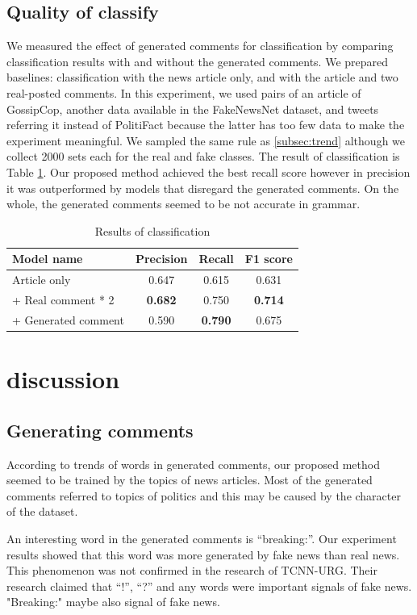 \documentclass[conference]{IEEEtran}
\begin{document}
\subsection{Quality of classify}
We measured the effect of generated comments for classification by comparing classification results with and without the generated comments.
We prepared baselines: classification with the news article only, and with the article and two real-posted comments.
In this experiment, we used pairs of an article of
GossipCop, another data available in the FakeNewsNet dataset, and tweets referring it instead of PolitiFact because the latter has too few data to make the experiment meaningful.
We sampled the same rule as \ref{subsec:trend} although we collect 2000 sets each for the real and fake classes.
The result of classification is Table \ref{tbl:classify_results}.
Our proposed method achieved the best recall score however in precision it was outperformed by models that disregard the generated comments.
On the whole, the generated comments seemed to be not accurate in grammar.

\begin{table}[!t]
    \renewcommand{\arraystretch}{1.3}
    \caption{Results of classification}
    \label{tbl:classify_results}
    \centering
    \begin{tabular}{lccc}
    \hline
    Model name           & Precision & Recall & F1 score \\ \hline
    Article only         & 0.647     & 0.615  & 0.631    \\
     + Real comment * 2  & \textbf{0.682}     & 0.750  & \textbf{0.714}    \\
     + Generated comment & 0.590     & \textbf{0.790}  & 0.675    \\ \hline
    \end{tabular}
    \end{table}
\section{discussion}
\subsection{Generating comments}
According to trends of words in generated comments,
our proposed method seemed to be trained by the topics of news articles.
Most of the generated comments referred to topics of politics and this may be caused by the character of the dataset.

An interesting word in the generated comments is ``breaking:''.
Our experiment results showed that this word was more generated by fake news than real news.
This phenomenon was not confirmed in the research of TCNN-URG\cite{ijcai2018-533}.
Their research claimed that ``!'', ``?'' and any words were important signals of fake news.
"Breaking:" maybe also signal of fake news.
\end{document}
